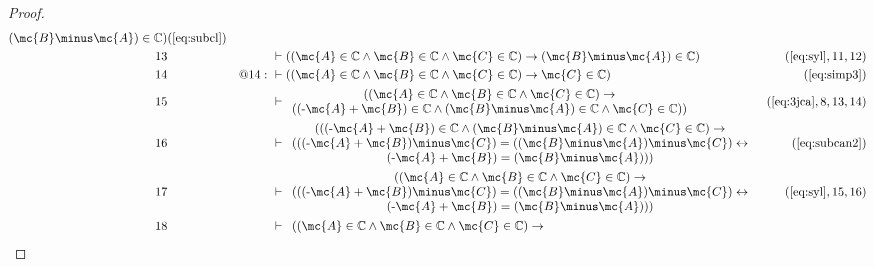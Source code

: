 \begin{proof}
\begin{align}
     ( \mc{B} \minus \mc{A} ) \in \mathbb{C}
     )&(\mbox{\ref{eq:subcl}})\notag
  \\ 13 &&  & \vdash ( ( \mc{A} \in \mathbb{C} \wedge \mc{B} \in \mathbb{C} \wedge \mc{C} \in
     \mathbb{C} ) \rightarrow ( \mc{B} \minus \mc{A} ) \in
     \mathbb{C} )&(\mbox{\ref{eq:syl}},11,12)\notag
  \\ 14 && @14:\  & \vdash ( ( \mc{A} \in \mathbb{C} \wedge \mc{B} \in \mathbb{C} \wedge
     \mc{C} \in \mathbb{C} ) \rightarrow \mc{C} \in \mathbb{C}
     )&(\mbox{\ref{eq:simp3}})\notag
  \\ 15 &&  & \vdash   
     \begin{array}{c}
     ( ( \mc{A} \in \mathbb{C} \wedge \mc{B} \in \mathbb{C} \wedge \mc{C} \in
     \mathbb{C} ) \rightarrow \\
     ( ( \textrm{-} \mc{A} + \mc{B} ) \in
     \mathbb{C} \wedge ( \mc{B} \minus \mc{A} ) \in \mathbb{C}
     \wedge \mc{C} \in \mathbb{C} )
     )
     \end{array}
     &(\mbox{\ref{eq:3jca}},8,13,14)\notag
  \\ 16 &&  & \vdash  
     \begin{array}{c}
     ( ( ( \textrm{-} \mc{A} + \mc{B} ) \in \mathbb{C} \wedge ( \mc{B} \minus
     \mc{A} ) \in \mathbb{C} \wedge \mc{C} \in \mathbb{C} )
     \rightarrow \\
      ( ( ( \textrm{-} \mc{A} + \mc{B} ) \minus \mc{C} ) = ( (
     \mc{B} \minus \mc{A} ) \minus \mc{C} ) \leftrightarrow \\
      ( \textrm{-}
     \mc{A} + \mc{B} ) = ( \mc{B} \minus \mc{A} ) )
     )
     \end{array}
     &(\mbox{\ref{eq:subcan2}})\notag
  \\ 17 &&  & \vdash  
     \begin{array}{c}
     ( ( \mc{A} \in \mathbb{C} \wedge \mc{B} \in \mathbb{C} \wedge \mc{C} \in
     \mathbb{C} ) \rightarrow \\
      ( ( ( \textrm{-} \mc{A} + \mc{B} )
     \minus \mc{C} ) = ( ( \mc{B} \minus \mc{A} ) \minus \mc{C} )
     \leftrightarrow \\
      ( \textrm{-} \mc{A} + \mc{B} ) = ( \mc{B} \minus \mc{A} )
     ) )
     \end{array}
     &(\mbox{\ref{eq:syl}},15,16)\notag
  \\ 18 &&  & \vdash  
     \begin{array}{c}
     ( ( \mc{A} \in \mathbb{C} \wedge \mc{B} \in \mathbb{C} \wedge \mc{C} \in
     \mathbb{C} ) \rightarrow \\

\end{array}
\end{align}
\end{proof}
